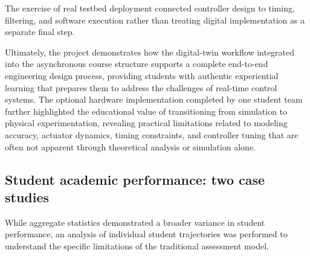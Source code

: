 \documentclass[journal]{IEEEtran}
\begin{document}

The exercise of real testbed deployment connected controller design
to timing, filtering, and software execution rather than treating
digital implementation as a separate final step.

Ultimately, the project demonstrates how the digital-twin workflow integrated into the asynchronous course structure supports a complete end-to-end engineering design process, providing students with authentic experiential learning that prepares them to address the challenges of real-time control systems. The optional hardware implementation completed by one student team further highlighted the educational value of transitioning from simulation to physical experimentation, revealing practical limitations related to modeling accuracy, actuator dynamics, timing constraints, and controller tuning that are often not apparent through theoretical analysis or simulation alone.


\subsection{Student academic performance: two case studies}
%
While aggregate statistics demonstrated a broader variance in student performance, an analysis of individual student trajectories was performed to understand the specific limitations of the traditional assessment model. 
%
\end{document}
